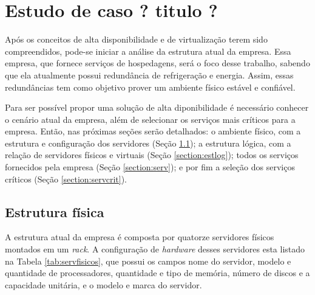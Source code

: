\chapter{Estudo de caso ? titulo ?}
\label{cap:estudodecaso}

Após os conceitos de alta disponibilidade e de virtualização terem sido compreendidos, pode-se iniciar a análise da estrutura atual da empresa.
Essa empresa, que fornece serviços de hospedagens, será o foco desse trabalho, sabendo que ela atualmente possui redundância de refrigeração 
e energia. Assim, essas redundâncias tem como objetivo prover um ambiente físico estável e confiável.

Para ser possível propor uma solução de alta diponibilidade é necessário conhecer o cenário atual da empresa, além de selecionar os serviços
mais críticos para a empresa. Então, nas próximas seções serão detalhados: o ambiente físico, com a estrutura e configuração dos servidores 
(Seção \ref{section:estfis}); a estrutura lógica, com a relação de servidores físicos e virtuais (Seção \ref{section:estlog}); todos os 
serviços fornecidos pela empresa (Seção \ref{section:serv}); e por fim a seleção dos serviços críticos (Seção \ref{section:servcrit}).

\section{Estrutura física}
\label{section:estfis}

A estrutura atual da empresa é composta por quatorze servidores físicos montados em um \textit{rack}. A configuração de \textit{hardware} desses 
servidores esta listado na Tabela \ref{tab:servfisicos}, que possui os campos nome do servidor, modelo e quantidade de processadores, quantidade
e tipo de memória, número de discos e a capacidade unitária, e o modelo e marca do servidor.

